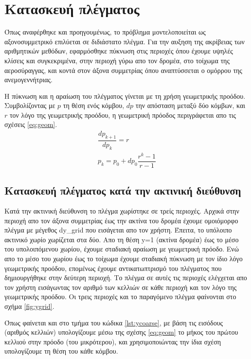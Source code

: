 \section{Κατασκευή πλέγματος}

Όπως αναφέρθηκε και προηγουμένως, το πρόβλημα μοντελοποιείται ως αξονοσυμμετρικό επιλύεται σε διδιάστατο πλέγμα. Για την αυξηση της ακρίβειας των αριθμητικών μεθόδων, εφαρμόσθηκε πύκνωση στις περιοχές όπου έχουμε υψηλές κλίσεις και συγκεκριμένα, στην περιοχή γύρω απο τον δρομέα, στο τοίχωμα της αεροσύραγγας, και κοντά στον άξονα συμμετρίας όπου αναπτύσσεται ο ομόρρου της ανεμογεννήτριας. 

Η πύκνωση και η αραίωση του πλέγματος γίνεται με τη χρήση γεωμετρικής προόδου. Συμβολίζοντας με $p$ τη θέση ενός κόμβου, $dp$ την απόσταση μεταξύ δύο κόμβων, και $r$ τον λόγο της γεωμετρικής προόδου, η γεωμετρική πρόοδος περιγράφεται απο τις σχέσεις \ref{eq:geom}.
\begin{equation}
   \begin{gathered}
       \dfrac{dp_{k+1}}{dp_{k}} = r\\
       p_k = p_0 + dp_0\dfrac{r^k-1}{r-1}
   \end{gathered} 
    \label{eq:geom}
\end{equation}

\subsection{Κατασκευή πλέγματος κατά την ακτινική διεύθυνση}

Κατά την ακτινική διεύθυνση το πλέγμα χωρίστηκε σε τρείς περιοχές. Αρχικά στην περιοχή απο τον άξονα συμμετρίας έως την ακτίνα του δρομέα έχουμε ομοιόμορφο πλέγμα με μέγεθος {dy\_grid} που εισάγεται απο τον χρήστη. Έπειτα, το υπόλοιπο ακτινικό χωρίο χωρίζεται στα δύο. Απο τη θέση y=1 (ακτίνα δρομέα) έως το μέσο του υπολοιπόμενου χωρίου, έχουμε σταδιακή αραίωση με γεωμετρική πρόοδο. Ενώ απο το μέσο του χωρίου έως το τοίχωμα έχουμε σταδιακή πύκνωση με τον ίδιο λόγο γεωμετρικής προόδου, επομένως έχουμε αντικατωπτρισμό του πλέγματος που δημιουργήθηκε στην δεύτερη περιοχή. Το πλέγμα σε αυτές τις περιοχές ελέγχεται απο τον χρήστη εισάγωντας τον αριθμό των κελλιών σε κάθε περιοχή και τον λόγο της γεωμετρικής προόδου. Οι τρεις περιοχές και το παραγόμενο πλέγμα φαίνονται στο σχήμα \ref{fig:ygrid}.

Όπως φαίνεται και στο τμήμα του κώδικα \ref{lst:ycoarse}, με βάση τις εισόδους (αριθμός κελλιών) υπολογίζουμε μέσω της σχέσης \ref{eq:geom} το μήκος του πρώτου κελλιού στην πρόοδο (του μικρότερου), και χρησιμοποιώντας την ίδια σχέση υπολογίζουμε τη θέση του κάθε κόμβου.


